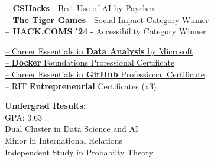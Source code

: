 \documentclass[10pt,a4paper,ragged2e,withhyper]{altacv}
\begin{document}
\begin{paracol}{2}

\textbf{ -- CSHacks} - Best Use of AI by Paychex\\
\textbf{ -- The Tiger Games} - Social Impact Category Winner\\
\textbf{ -- HACK.COMS '24} - Accessibility Category Winner\\

\divider

\href{https://www.linkedin.com/learning/certificates/2cb69378c606fec5a6f3a107b99a896862db392b7a3692f71a6b53af5d5545c5}{ -- Career Essentials in \textbf{Data Analysis} by Microsoft}\\
\href{https://www.linkedin.com/learning/certificates/7b952323152e258ca468c33ddc9ebcf3c55036f58a5cfb3fb9c1410da655aaa5}{ -- \textbf{Docker} Foundations Professional Certificate}\\
\href{https://www.linkedin.com/learning/certificates/7facc28a13405134b3b7fa785303e9b1cf697f32d67f759e89960fbdc8a044d9}{ -- Career Essentials in \textbf{GitHub} Professional Certificate}\\
\href{https://rit.edu/simonecenter}{ -- RIT \textbf{Entrepreneurial} Certificates (x3)}\\

\switchcolumn



\textbf{Undergrad Results:}\\
GPA: 3.63\\
Dual Cluster in Data Science and AI\\
Minor in International Relations\\
Independent Study in Probabilty Theory



\medskip



\end{paracol}
\end{document}
